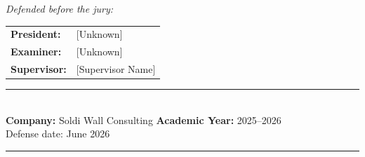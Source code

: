 \begin{titlepage}
\vspace{2cm}

{\small\textit{Defended before the jury:}}\\[8pt]
\begin{tabular}{ll}
  \textbf{President:}  & [Unknown] \\[4pt]
  \textbf{Examiner:}   & [Unknown] \\[4pt]
  \textbf{Supervisor:} & [Supervisor Name] \\
\end{tabular}

\vfill

\noindent\rule{\textwidth}{0.5pt}\\[6pt]
{\small\textbf{Company:} Soldi Wall Consulting
\hfill
\textbf{Academic Year:} 2025--2026}\\[4pt]
{\small Defense date: June 2026}
\noindent\rule{\textwidth}{1.5pt}

\end{titlepage}
